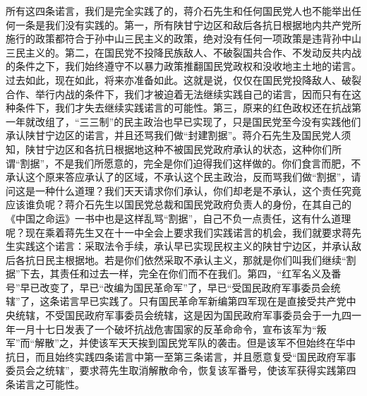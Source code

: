 所有这四条诺言，我们是完全实践了的，蒋介石先生和任何国民党人也不能举出任何一条是我们没有实践的。第一，所有陕甘宁边区和敌后各抗日根据地内共产党所施行的政策都符合于孙中山三民主义的政策，绝对没有任何一项政策是违背孙中山三民主义的。第二，在国民党不投降民族敌人、不破裂国共合作、不发动反共内战的条件之下，我们始终遵守不以暴力政策推翻国民党政权和没收地主土地的诺言。过去如此，现在如此，将来亦准备如此。这就是说，仅仅在国民党投降敌人、破裂合作、举行内战的条件下，我们才被迫着无法继续实践自己的诺言，因而只有在这种条件下，我们才失去继续实践诺言的可能性。第三，原来的红色政权还在抗战第一年就改组了，“三三制”的民主政治也早已实现了，只是国民党至今没有实践他们承认陕甘宁边区的诺言，并且还骂我们做“封建割据”。蒋介石先生及国民党人须知，陕甘宁边区和各抗日根据地这种不被国民党政府承认的状态，这种你们所谓“割据”，不是我们所愿意的，完全是你们迫得我们这样做的。你们食言而肥，不承认这个原来答应承认了的区域，不承认这个民主政治，反而骂我们做“割据”，请问这是一种什么道理？我们天天请求你们承认，你们却老是不承认，这个责任究竟应该谁负呢？蒋介石先生以国民党总裁和国民党政府负责人的身份，在其自己的《中国之命运》一书中也是这样乱骂“割据”，自己不负一点责任，这有什么道理呢？现在乘着蒋先生又在十一中全会上要求我们实践诺言的机会，我们就要求蒋先生实践这个诺言：采取法令手续，承认早已实现民权主义的陕甘宁边区，并承认敌后各抗日民主根据地。若是你们依然采取不承认主义，那就是你们叫我们继续“割据”下去，其责任和过去一样，完全在你们而不在我们。第四，“红军名义及番号”早已改变了，早已“改编为国民革命军”了，早已“受国民政府军事委员会统辖”了，这条诺言早已实践了。只有国民革命军新编第四军现在是直接受共产党中央统辖，不受国民政府军事委员会统辖，这是因为国民政府军事委员会于一九四一年一月十七日发表了一个破坏抗战危害国家的反革命命令，宣布该军为“叛军”而“解散”之，并使该军天天挨到国民党军队的袭击。但是该军不但始终在华中抗日，而且始终实践四条诺言中第一至第三条诺言，并且愿意复受“国民政府军事委员会之统辖”，要求蒋先生取消解散命令，恢复该军番号，使该军获得实践第四条诺言之可能性。

